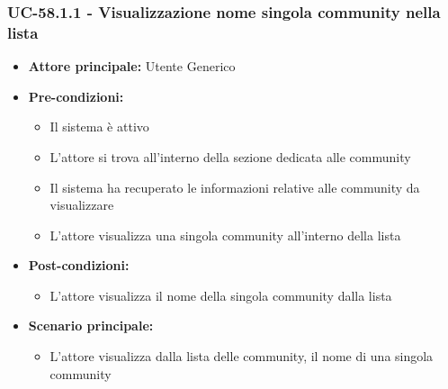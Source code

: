 \documentclass[a4paper,12pt]{article}
\begin{document}
\subsubsection{UC-58.1.1 - Visualizzazione nome singola community nella lista} \label{subsec:UC-58.1.1}
\begin{itemize}
    \item \textbf{Attore principale:} Utente Generico
    \item \textbf{Pre-condizioni:} 
    \begin{itemize}
        \item Il sistema è attivo
        \item L'attore si trova all'interno della sezione dedicata alle community
        \item Il sistema ha recuperato le informazioni relative alle community da visualizzare
        \item L'attore visualizza una singola community all'interno della lista
    \end{itemize}
    \item \textbf{Post-condizioni:}
    \begin{itemize}
        \item L'attore visualizza il nome della singola community dalla lista
    \end{itemize}
    \item \textbf{Scenario principale:} 
    \begin{itemize}
        \item L'attore visualizza dalla lista delle community, il nome di una singola community
    \end{itemize}
\end{itemize}
\end{document}
